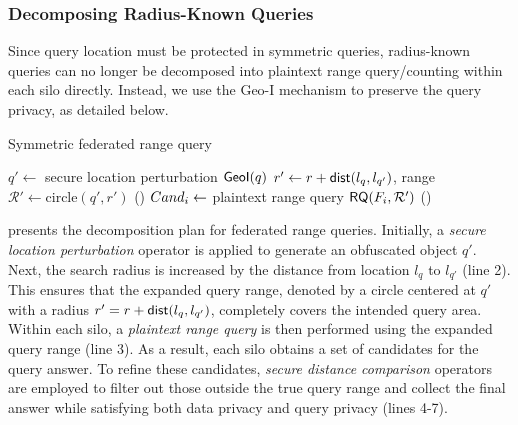\subsubsection{Decomposing Radius-Known Queries}\label{sec:symmetric-rad}

Since query location must be protected in symmetric queries, radius-known queries can no longer be decomposed into plaintext range query/counting within each silo directly. 
Instead, we use the Geo-I mechanism \cite{DBLP:conf/ccs/AndresBCP13,DBLP:journals/corr/abs-2312-12012} to preserve the query privacy, as detailed below.

\setlength{\textfloatsep}{1ex}
\setlength{\floatsep}{1ex}
\begin{algorithm}[t]
	\caption{\small{Symmetric federated range query}}\label{alg:rq}
    $q' \gets$ secure location perturbation $\textsf{GeoI}(q)$\;
    $r' \gets r + \textsf{dist}(l_q, l_{q'})$, range $\mathcal{R'} \gets \text{circle}(q', r')$\;
    \ForEach(){}{
        $Cand_i \gets$ plaintext range query $\textsf{RQ}(F_i, \mathcal{R'})$
    }
    \For(){}{
    }
\end{algorithm}
\afterpage{\global\setlength{\textfloatsep}{\oldtextfloatsep}}
\afterpage{\global\setlength{\floatsep}{\oldfloatsep}}

 presents the decomposition plan for federated range queries.
Initially, a \textit{secure location perturbation} operator is applied to generate an obfuscated object $q'$.
Next, the search radius is increased by the distance from location $l_q$ to $l_{q'}$ (line 2).
This ensures that the expanded query range, denoted by a circle centered at $q'$ with a radius $r' = r + \textsf{dist}(l_q, l_{q'})$, completely covers the intended query area.
Within each silo, a \textit{plaintext range query} is then performed using the expanded query range (line 3).
As a result, each silo obtains a set of candidates for the query answer.
To refine these candidates, \textit{secure distance comparison} operators are employed to filter out those outside the true query range and collect the final answer while satisfying both data privacy and query privacy (lines 4-7).

